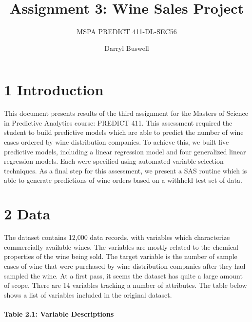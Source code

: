 \documentclass[]{article}
\title{Assignment 3: Wine Sales Project}
\subtitle{MSPA PREDICT 411-DL-SEC56}
\author{Darryl Buswell}
\date{}
\let\oldparagraph\paragraph
\renewcommand{\paragraph}[1]{\oldparagraph{#1}\mbox{}}
\begin{document}
\maketitle

\section{1 Introduction}\label{introduction}

This document presents results of the third assignment for the Masters
of Science in Predictive Analytics course: PREDICT 411. This assessment
required the student to build predictive models which are able to
predict the number of wine cases ordered by wine distribution companies.
To achieve this, we built five predictive models, including a linear
regression model and four generalized linear regression models. Each
were specified using automated variable selection techniques. As a final
step for this assessment, we present a SAS routine which is able to
generate predictions of wine orders based on a withheld test set of
data.

\section{2 Data}\label{data}

The dataset contains 12,000 data records, with variables which
characterize commercially available wines. The variables are mostly
related to the chemical properties of the wine being sold. The target
variable is the number of sample cases of wine that were purchased by
wine distribution companies after they had sampled the wine. At a first
pass, it seems the dataset has quite a large amount of scope. There are
14 variables tracking a number of attributes. The table below shows a
list of variables included in the original dataset.

\paragraph{Table 2.1: Variable
Descriptions}\label{table-2.1-variable-descriptions}
\end{document}
